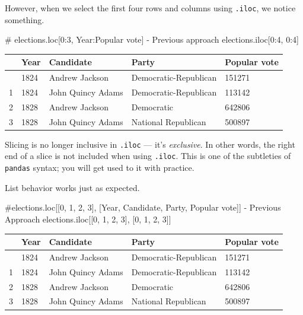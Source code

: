 \documentclass[
  letterpaper,
  DIV=11,
  numbers=noendperiod]{scrreprt}
\newenvironment{Shaded}{\begin{snugshade}}{\end{snugshade}}
\newcommand{\CommentTok}[1]{\textcolor[rgb]{0.37,0.37,0.37}{#1}}
\newcommand{\DecValTok}[1]{\textcolor[rgb]{0.68,0.00,0.00}{#1}}
\newcommand{\NormalTok}[1]{\textcolor[rgb]{0.00,0.23,0.31}{#1}}
\begin{document}
However, when we select the first four rows and columns using
\texttt{.iloc}, we notice something.

\begin{Shaded}
\begin{Highlighting}[]
\CommentTok{\# elections.loc[0:3, \textquotesingle{}Year\textquotesingle{}:\textquotesingle{}Popular vote\textquotesingle{}] {-} Previous approach}
\NormalTok{elections.iloc[}\DecValTok{0}\NormalTok{:}\DecValTok{4}\NormalTok{, }\DecValTok{0}\NormalTok{:}\DecValTok{4}\NormalTok{]}
\end{Highlighting}
\end{Shaded}

\begin{longtable}[]{@{}lllll@{}}
\toprule\noalign{}
& Year & Candidate & Party & Popular vote \\
\midrule\noalign{}
\endhead
\bottomrule\noalign{}
\endlastfoot
0 & 1824 & Andrew Jackson & Democratic-Republican & 151271 \\
1 & 1824 & John Quincy Adams & Democratic-Republican & 113142 \\
2 & 1828 & Andrew Jackson & Democratic & 642806 \\
3 & 1828 & John Quincy Adams & National Republican & 500897 \\
\end{longtable}

Slicing is no longer inclusive in \texttt{.iloc} --- it's
\emph{exclusive}. In other words, the right end of a slice is not
included when using \texttt{.iloc}. This is one of the subtleties of
\texttt{pandas} syntax; you will get used to it with practice.

List behavior works just as expected.

\begin{Shaded}
\begin{Highlighting}[]
\CommentTok{\#elections.loc[[0, 1, 2, 3], [\textquotesingle{}Year\textquotesingle{}, \textquotesingle{}Candidate\textquotesingle{}, \textquotesingle{}Party\textquotesingle{}, \textquotesingle{}Popular vote\textquotesingle{}]] {-} Previous Approach}
\NormalTok{elections.iloc[[}\DecValTok{0}\NormalTok{, }\DecValTok{1}\NormalTok{, }\DecValTok{2}\NormalTok{, }\DecValTok{3}\NormalTok{], [}\DecValTok{0}\NormalTok{, }\DecValTok{1}\NormalTok{, }\DecValTok{2}\NormalTok{, }\DecValTok{3}\NormalTok{]]}
\end{Highlighting}
\end{Shaded}

\begin{longtable}[]{@{}lllll@{}}
\toprule\noalign{}
& Year & Candidate & Party & Popular vote \\
\midrule\noalign{}
\endhead
\bottomrule\noalign{}
\endlastfoot
0 & 1824 & Andrew Jackson & Democratic-Republican & 151271 \\
1 & 1824 & John Quincy Adams & Democratic-Republican & 113142 \\
2 & 1828 & Andrew Jackson & Democratic & 642806 \\
3 & 1828 & John Quincy Adams & National Republican & 500897 \\
\end{longtable}
\end{document}
